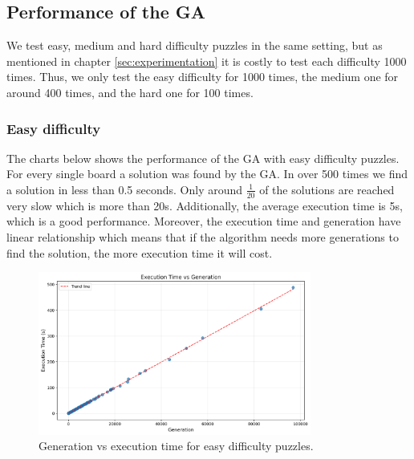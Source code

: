 \subsection{Performance of the GA}

We test easy, medium and hard difficulty puzzles in the same setting, but as mentioned in chapter \ref{sec:experimentation} it is costly to test each difficulty 1000 times. Thus, we only test the easy difficulty for 1000 times, the medium one for around 400 times, and the hard one for 100 times.

\subsubsection{Easy difficulty}

The charts below shows the performance of the GA with easy difficulty puzzles. For every single board a solution was found by the GA. In over 500 times we find a solution in less than 0.5 seconds. Only around \(\frac{1}{20}\) of the solutions are reached very slow which is more than 20s.
Additionally, the average execution time is 5s, which is a good performance. Moreover, the execution time and generation have linear relationship which means that if the algorithm needs more generations to find the solution, the more execution time it will cost.

\begin{figure}[H]
\centering
\includegraphics[width=0.8\textwidth]{resources/generation_vs_execution_time_easy.png}
\caption{Generation vs execution time for easy difficulty puzzles.}
\label{fig:generation_vs_execution_time_easy}
\end{figure}

